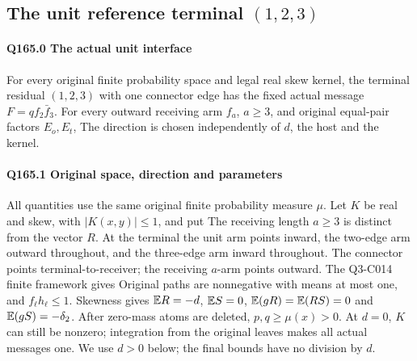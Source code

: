 \subsection{The unit reference terminal $(1,\allowbreak 2,\allowbreak 3)$}\label{proof:Q5-C165}
\paragraph{Q165.0 The actual unit interface}\label{part:Q165.0}
For every original finite probability space and legal real skew kernel,
the terminal residual $(1,\allowbreak 2,\allowbreak 3)$ with one connector edge has the fixed
actual message $F=\allowbreak qf_2\bar f_3$. For every outward receiving arm
$f_a$, $a\ge\allowbreak 3$, and original equal-pair factors $E_o,\allowbreak E_t$,
The direction is chosen independently of $d$, the host and the kernel.

\paragraph{Q165.1 Original space, direction and parameters}\label{part:Q165.1}
All quantities use the same original finite probability measure $\mu$.
Let $K$ be real and skew, with $|K(x,\allowbreak y)|\le\allowbreak 1$, and put
The receiving length $a\ge\allowbreak 3$ is distinct from the vector $R$.
At the terminal the unit arm points inward, the two-edge arm outward
throughout, and the three-edge arm inward throughout. The connector
points terminal-to-receiver; the receiving $a$-arm points outward.
The Q3-C014 finite framework gives
Original paths are nonnegative with means at most one, and
$f_\ell h_\ell\le\allowbreak 1$. Skewness gives
$\mathbb E R=\allowbreak -d$, $\mathbb E S=\allowbreak 0$, $\mathbb E(gR)=\allowbreak \mathbb E(RS)=\allowbreak 0$ and $\mathbb E(gS)=\allowbreak -\delta_2$.
After zero-mass atoms are deleted, $p,\allowbreak q\ge\allowbreak \mu(x)>\allowbreak 0$.
At $d=\allowbreak 0$, $K$ can still be nonzero; integration from the original leaves
makes all actual messages one. We use $d>\allowbreak 0$ below; the final bounds
have no division by $d$.

